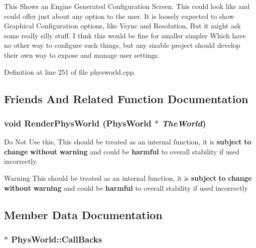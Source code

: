 This Shows an Engine Generated Configuration Screen. This could look like and could offer just about any option to the user. It is loosely expected to show Graphical Configuration options, like Vsync and Resolution, But it might ask some really silly stuff. I thnk this would be fine for smaller simpler Which have no other way to configure such things, but any sizable project should develop their own way to expose and manage user settings. 

Definition at line 251 of file physworld.cpp.

\subsection{Friends And Related Function Documentation}
\hypertarget{classPhysWorld_a54ca2a75bbccb9b2129f434874f1e693}{
\subsubsection[{RenderPhysWorld}]{\setlength{\rightskip}{0pt plus 5cm}void RenderPhysWorld ({\bf PhysWorld} $\ast$ {\em TheWorld})}}
\label{db/df5/classPhysWorld_a54ca2a75bbccb9b2129f434874f1e693}


Do Not Use this, This should be treated as an internal function, it is {\bfseries subject} {\bfseries to} {\bfseries change} {\bfseries without} {\bfseries warning} and could be {\bfseries harmful} to overall stability if used incorrectly. \begin{DoxyWarning}{Warning}
This should be treated as an internal function, it is {\bfseries subject} {\bfseries to} {\bfseries change} {\bfseries without} {\bfseries warning} and could be {\bfseries harmful} to overall stability if used incorrectly 
\end{DoxyWarning}


\subsection{Member Data Documentation}
\hypertarget{classPhysWorld_a080ea6f1584374b07d3c1f29c7ed64df}{
\subsubsection[{CallBacks}]{$\ast$ {\bf PhysWorld::CallBacks}}}
\label{db/df5/classPhysWorld_a080ea6f1584374b07d3c1f29c7ed64df}


